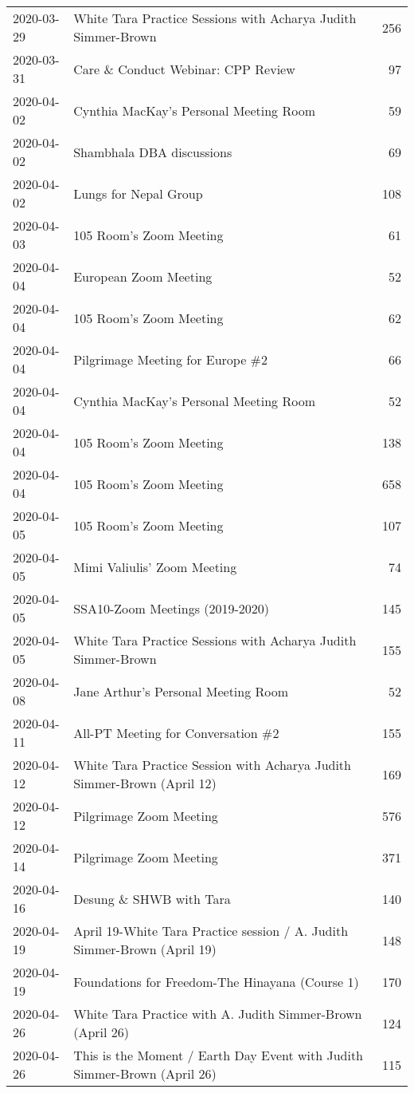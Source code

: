 \documentclass[
]{article}
\begin{document}
\begin{longtable}{llr}
2020-03-29 & White Tara Practice Sessions with Acharya Judith Simmer-Brown & 256 \\ 
2020-03-31 & Care \& Conduct Webinar: CPP Review & 97 \\ 
2020-04-02 & Cynthia MacKay's Personal Meeting Room & 59 \\ 
2020-04-02 & Shambhala DBA discussions & 69 \\ 
2020-04-02 & Lungs for Nepal Group & 108 \\ 
2020-04-03 & 105 Room's Zoom Meeting & 61 \\ 
2020-04-04 & European Zoom Meeting & 52 \\ 
2020-04-04 & 105 Room's Zoom Meeting & 62 \\ 
2020-04-04 & Pilgrimage Meeting for Europe \#2 & 66 \\ 
2020-04-04 & Cynthia MacKay's Personal Meeting Room & 52 \\ 
2020-04-04 & 105 Room's Zoom Meeting & 138 \\ 
2020-04-04 & 105 Room's Zoom Meeting & 658 \\ 
2020-04-05 & 105 Room's Zoom Meeting & 107 \\ 
2020-04-05 & Mimi Valiulis' Zoom Meeting & 74 \\ 
2020-04-05 & SSA10-Zoom Meetings (2019-2020) & 145 \\ 
2020-04-05 & White Tara Practice Sessions with Acharya Judith Simmer-Brown & 155 \\ 
2020-04-08 & Jane Arthur's Personal Meeting Room & 52 \\ 
2020-04-11 & All-PT Meeting for Conversation \#2 & 155 \\ 
2020-04-12 & White Tara Practice Session with Acharya Judith Simmer-Brown (April 12) & 169 \\ 
2020-04-12 & Pilgrimage Zoom Meeting & 576 \\ 
2020-04-14 & Pilgrimage Zoom Meeting & 371 \\ 
2020-04-16 & Desung \& SHWB with Tara & 140 \\ 
2020-04-19 & April 19-White Tara Practice session / A. Judith Simmer-Brown (April 19) & 148 \\ 
2020-04-19 & Foundations for Freedom-The Hinayana (Course 1) & 170 \\ 
2020-04-26 & White Tara Practice with A. Judith Simmer-Brown (April 26) & 124 \\ 
2020-04-26 & This is the Moment / Earth Day Event with Judith Simmer-Brown (April 26) & 115 \\ 

\end{longtable}
\end{document}
